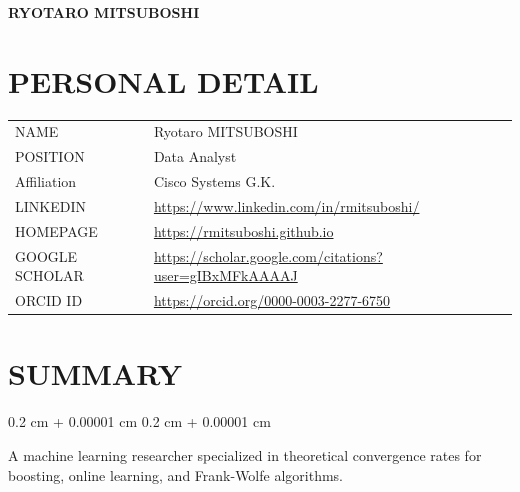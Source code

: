 \documentclass[10pt, letterpaper]{article}
\newenvironment{onecolentry}{
    \begin{adjustwidth}{
        0.2 cm + 0.00001 cm
    }{
        0.2 cm + 0.00001 cm
    }
}{
    \end{adjustwidth}
} %
\newenvironment{header}{
    \setlength{\topsep}{0pt}\par\kern\topsep\centering\linespread{1.5}
}{
    \par\kern\topsep
} %
\begin{document}
    \newcommand{\AND}{\unskip
        \cleaders\copy\ANDbox\hskip\wd\ANDbox
        \ignorespaces
    }
    \newsavebox\ANDbox
    \sbox\ANDbox{}

    \begin{header}
        \textbf{\fontsize{24 pt}{24 pt}\selectfont RYOTARO MITSUBOSHI}
    \end{header}

    \vspace{0.5 cm}


    \section{PERSONAL DETAIL}
        \begin{tabular}{ll}
            NAME & Ryotaro MITSUBOSHI \\
            POSITION & Data Analyst \\
            Affiliation & Cisco Systems G.K. \\
            LINKEDIN & \url{https://www.linkedin.com/in/rmitsuboshi/} \\
            HOMEPAGE & \url{https://rmitsuboshi.github.io} \\
            GOOGLE SCHOLAR & \url{https://scholar.google.com/citations?user=gIBxMFkAAAAJ} \\
            ORCID ID & \url{https://orcid.org/0000-0003-2277-6750} \\
        \end{tabular}

    \section{SUMMARY}

    \begin{onecolentry}
        A machine learning researcher specialized in theoretical convergence rates for boosting, online learning, and Frank-Wolfe algorithms.
    \end{onecolentry}
\end{document}
